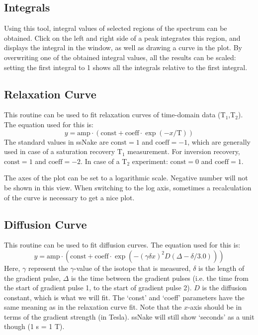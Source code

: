 \documentclass[11pt,a4paper]{article}
\begin{document}
\subsection{Integrals}
Using this tool, integral values of selected regions of the spectrum can be obtained. Click on the
left and right side of a peak integrates this region, and displays the integral in the window, as
well as drawing a curve in the plot. By overwriting one of the obtained integral values, all the
results can be scaled: setting the first integral to 1 shows all the integrals relative to the first
integral.

\subsection{Relaxation Curve}
This routine can be used to fit relaxation curves of time-domain data (T$_1$,T$_2$). The equation
used for this is:
\begin{equation}
  y = \text{amp} \cdot (\text{const} + \text{coeff} \cdot \exp(-x/\text{T}))
\end{equation}
The standard values in ssNake are $\text{const} = 1$ and $\text{coeff} = -1$, which are generally
used in case of a saturation recovery T$_1$ measurement. For inversion recovery,  $\text{const} = 1$
and $\text{coeff} = -2$. In case of a T$_2$ experiment:  $\text{const} = 0$
and $\text{coeff} = 1$.

The axes of the plot can be set to a logarithmic scale. Negative number will not be shown in this
view. When switching to the log axis, sometimes a recalculation of the curve is necessary to get a
nice plot.


\subsection{Diffusion Curve}
This routine can be used to fit diffusion curves. The equation
used for this is:
\begin{equation}
   y = \text{amp} \cdot (\text{const} + \text{coeff} \cdot \exp(-(\gamma  \delta  x)^2  D  (\Delta -\delta / 3.0)))
\end{equation}
Here, $\gamma$ represent the $\gamma$-value of the isotope that is measured, $\delta$ is the length
of the gradient pulse, $\Delta$ is the time between the gradient pulses (i.e. the time from the
start of gradient pulse 1, to the start of gradient pulse 2). $D$ is the diffusion constant, which
is what we will fit. The `const' and `coeff' parameters have the same meaning as in the relaxation
curve fit. Note that the $x$-axis should be in terms of the gradient strength (in Tesla). ssNake
will still show `seconds' as a unit though (1 s = 1 T).
\end{document}
